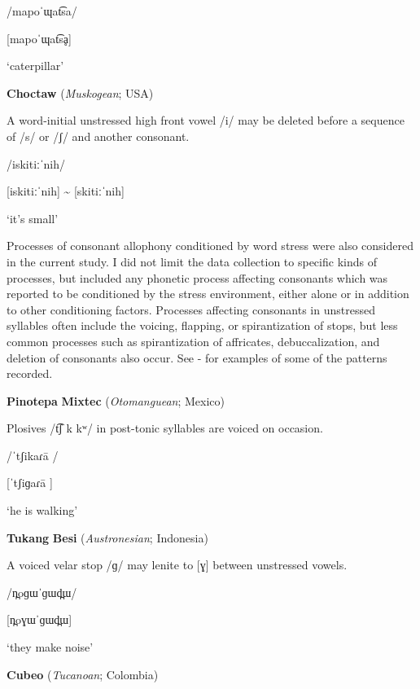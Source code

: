 /mapoˈɰat͡sa/

[mapoˈɰat͡sḁ]

\glt ‘caterpillar’

\citep[60-1]{Facundes2000}
\z

\ea\label{ex:(5.17)}
  \textbf{Choctaw} (\textit{Muskogean}; USA)

A word-initial unstressed high front vowel /i/ may be deleted before a sequence of /s/ or /ʃ/ and another consonant.

/iskitiːˈnih/

[iskitiːˈnih] {\textasciitilde} [skitiːˈnih]

\glt ‘it’s small’

\citep[19]{Broadwell2006}
\z

  Processes of consonant allophony conditioned by word stress were also considered in the current study. I did not limit the data collection to specific kinds of processes, but included any phonetic process affecting consonants which was reported to be conditioned by the stress environment, either alone or in addition to other conditioning factors. Processes affecting consonants in unstressed syllables often include the voicing, flapping, or spirantization of stops, but less common processes such as spirantization of affricates, debuccalization, and deletion of consonants also occur. See - for examples of some of the patterns recorded.

\ea\label{ex:(5.18)}
  \textbf{Pinotepa} \textbf{Mixtec} (\textit{Otomanguean}; Mexico)

Plosives /t͡ʃ k kʷ/ in post-tonic syllables are voiced on occasion.

/ˈtʃikaɾa\={} /

[ˈtʃiɡaɾa\={} ]

\glt ‘he is walking’

\citep[5]{Bradley1970}
\z

\ea\label{ex:(5.19)}
  \textbf{Tukang} \textbf{Besi} (\textit{Austronesian}; Indonesia)

A voiced velar stop /ɡ/ may lenite to [ɣ] between unstressed vowels.

/n̪oɡɯˈɡɯd̪ɯ/

[n̪oɣɯˈɡɯd̪ɯ]

\glt ‘they make noise’

\citep[27]{Donohue1999}

\z

\ea\label{ex:(5.20)}
  \textbf{Cubeo} (\textit{Tucanoan}; Colombia)


